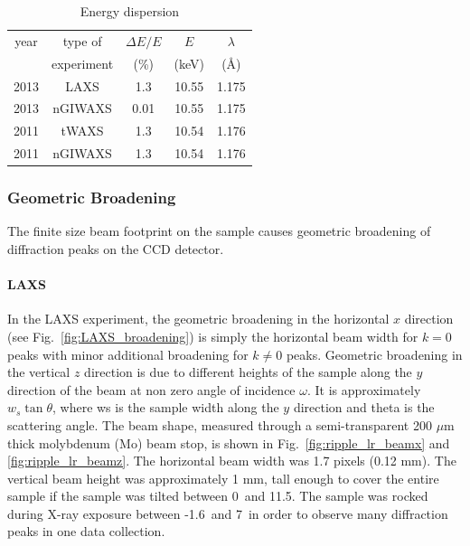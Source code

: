 \begin{table}[htbp]
  \centering
  \begin{tabular}{ccccc}
    \hline
    year & type of & $\Delta E/E$ & $E$ & $\lambda$ \\
     & experiment & (\%) & (keV) & (\AA) \\
    \hline
    2013 & LAXS & 1.3 & 10.55 & 1.175 \\
    2013 & nGIWAXS & 0.01 & 10.55 & 1.175 \\
    2011 & tWAXS & 1.3 & 10.54 & 1.176 \\
    2011 & nGIWAXS & 1.3 & 10.54 & 1.176 \\
    \hline
  \end{tabular}
  \caption[Energy dispersion]
  {Energy dispersion}
  \label{tab:energy_dispersion}
\end{table}

\subsubsection{Geometric Broadening}\label{sec:geometric_broadening}
The finite size beam footprint on the sample causes
geometric broadening of diffraction peaks on the CCD detector.

\paragraph{LAXS}
In the LAXS experiment, 
the geometric broadening in the horizontal $x$ direction 
(see Fig.~\ref{fig:LAXS_broadening}) is simply the 
horizontal beam width for $k=0$ peaks with minor additional broadening
for $k\neq 0$ peaks. Geometric broadening in the vertical $z$ direction
is due to different heights of the sample along the $y$ direction of the beam 
at non zero angle of incidence $\omega$. It is 
approximately
$w_s\tan\theta$, where \gls{ws} is the sample width along the $y$
direction and \gls{theta} is the scattering angle.
The beam shape, measured through a semi-transparent 200 $\mu$m thick
molybdenum (Mo) beam stop, is shown in Fig.~\ref{fig:ripple_lr_beamx}
and \ref{fig:ripple_lr_beamz}.
The horizontal beam width was 1.7 pixels (0.12 mm). The vertical beam
height was approximately 1 mm, tall enough to cover the entire sample
if the sample was tilted between 0\textdegree\ and 11.5\textdegree. 
The sample was rocked
during X-ray exposure between -1.6\textdegree\ and 7\textdegree\ 
in order to observe many diffraction peaks in one data collection.

